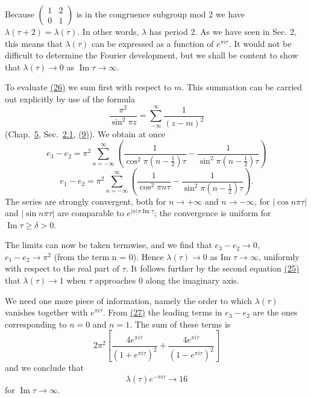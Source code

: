 Because $\begin{pmatrix} 1 & 2 \\ 0 & 1 \end{pmatrix}$ is in the congruence subgroup mod 2 we have $\lambda(\tau + 2) = \lambda(\tau)$. In other words, $\lambda$ has period 2. As we have seen in Sec. 2, this means that $\lambda(\tau)$ can be expressed as a function of $e^{\pi i\tau}$. It would not be difficult to determine the Fourier development, but we shall be content to show that $\lambda(\tau) \to 0$ as $\operatorname{Im} \tau \to \infty$.

To evaluate \hyperref[eq:7.26]{(26)} we sum first with respect to $m$. This summation can be carried out explicitly by use of the formula
\begin{equation*}
\frac {\pi^ {2}}{\sin^ {2} \pi z} = \sum_ {- \infty} ^ {\infty} \frac {1}{(z - m) ^ {2}}
\end{equation*}
(Chap.~\hyperref[chap:5]{5}, Sec.~\hyperref[sec:5.2.1]{2.1}, \hyperref[eq:7.9]{(9)}). We obtain at once
\begin{equation*}
e _ {3} - e _ {2} = \pi^ {2} \sum_ {n = - \infty} ^ {\infty} \left(\frac {1}{\cos^ {2} \pi (n - \frac {1}{2}) \tau} - \frac {1}{\sin^ {2} \pi (n - \frac {1}{2}) \tau}\right)\tag{27}\label{eq:7.27}
\end{equation*}
\begin{equation*}
e _ {1} - e _ {2} = \pi^ {2} \sum_ {n = - \infty} ^ {\infty} \left(\frac {1}{\cos^ {2} \pi n \tau} - \frac {1}{\sin^ {2} \pi (n - \frac {1}{2}) \tau}\right).
\end{equation*}
The series are strongly convergent, both for $n \to +\infty$ and $n \to -\infty$, for $|\cos n\pi\tau|$ and $|\sin n\pi\tau|$ are comparable to $e^{|n|\pi\operatorname{Im}\tau}$; the convergence is uniform for $\operatorname{Im}\tau \geq \delta > 0$.

The limits can now be taken termwise, and we find that $e_{3} - e_{2} \rightarrow 0$, $e_{1} - e_{2} \rightarrow \pi^{2}$ (from the term n = 0). Hence $\lambda(\tau) \rightarrow 0$ as Im $\tau \rightarrow \infty$, uniformly with respect to the real part of $\tau$. It follows further by the second equation \hyperref[eq:7.25]{(25)} that $\lambda(\tau) \rightarrow 1$ when $\tau$ approaches 0 along the imaginary axis.

We need one more piece of information, namely the order to which $\lambda(\tau)$ vanishes together with $e^{\pi i\tau}$. From \hyperref[eq:7.27]{(27)} the leading terms in $e_3 - e_2$ are the ones corresponding to $n = 0$ and $n = 1$. The sum of these terms is
\begin{equation*}
2 \pi^ {2} \left[ \frac {4 e ^ {\pi i \tau}}{(1 + e ^ {\pi i \tau}) ^ {2}} + \frac {4 e ^ {\pi i \tau}}{(1 - e ^ {\pi i \tau}) ^ {2}} \right]
\end{equation*}
and we conclude that
\begin{equation*}
\lambda (\tau) e ^ {- \pi i \tau} \rightarrow 16\tag{28}\label{eq:7.28}
\end{equation*}
for $\operatorname{Im} \tau \to \infty$.

